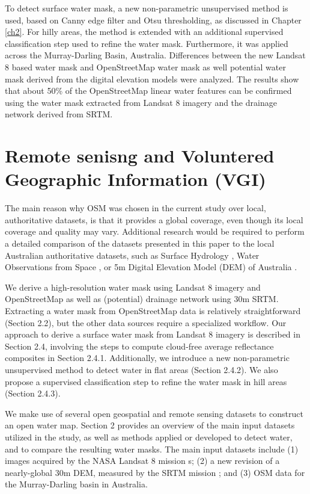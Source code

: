 To detect surface water mask, a new non-parametric unsupervised method is used, based on Canny edge filter and Otsu thresholding, as discussed in Chapter \ref{ch2}. For hilly areas, the method is extended with an additional supervised classification step used to refine the water mask. Furthermore, it was applied across the Murray-Darling Basin, Australia. Differences between the new Landsat 8 based water mask and  OpenStreetMap water mask as well potential water mask derived from the digital elevation models were analyzed. The results show that about 50\% of the OpenStreetMap linear water features can be confirmed using the water mask extracted from Landsat 8 imagery and the drainage network derived from SRTM. 

\section{Remote senisng and Voluntered Geographic Information (VGI)}
The main reason why OSM was chosen in the current study over local, authoritative datasets, is that it provides a global coverage, even though its local coverage and quality may vary. Additional research would be required to perform a detailed comparison of the datasets presented in this paper to the local Australian authoritative datasets, such as Surface Hydrology \citet{CrossmanSLi2015}, Water Observations from Space \citet{Mueller2015}, or 5m Digital Elevation Model (DEM) of Australia \citet{dataAUDEM5m}.

We derive a high-resolution water mask using Landsat 8 imagery and OpenStreetMap as well as (potential) drainage network using 30m SRTM. Extracting a water mask from OpenStreetMap data is relatively straightforward (Section 2.2), but the other data sources require a specialized workflow. Our approach to derive a surface water mask from Landsat 8 imagery is described in Section 2.4, involving the steps to compute cloud-free average reflectance composites in Section 2.4.1. Additionally, we introduce a new non-parametric unsupervised method to detect water in flat areas (Section 2.4.2). We also propose a supervised classification step to refine the water mask in hill areas (Section 2.4.3). 

We make use of several open geospatial and remote sensing datasets to construct an open water map. Section 2 provides an overview of the main input datasets utilized in the study, as well as methods applied or developed to detect water, and to compare the resulting water masks. The main input datasets include (1) images acquired by the NASA Landsat 8 mission \citet{Roy2014}s; (2) a new revision of a nearly-global 30m DEM, measured by the SRTM mission \citet{dataSRTM}; and (3) OSM data for the Murray-Darling basin in Australia. 

